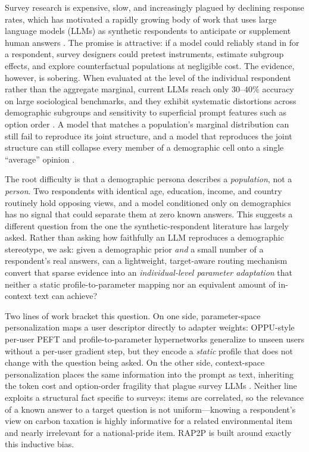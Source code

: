 \documentclass[letterpaper]{article} %
\begin{document}
Survey research is expensive, slow, and increasingly plagued by declining
response rates, which has motivated a rapidly growing body of work that uses
large language models (LLMs) as synthetic respondents to anticipate or
supplement human answers \citep{bail2024generative,sarstedt2024using,heyde2024populi,suh2025language}.
The promise is attractive: if a model could reliably stand in for a
respondent, survey designers could pretest instruments, estimate subgroup
effects, and explore counterfactual populations at negligible cost. The
evidence, however, is sobering. When evaluated at the level of the individual
respondent rather than the aggregate marginal, current LLMs reach only
$30$--$40\%$ accuracy on large sociological benchmarks, and they exhibit
systematic distortions across demographic subgroups and sensitivity to
superficial prompt features such as option order
\citep{boelaert2025machine,williams2026beyond,bult2025llms}. A model that
matches a population's marginal distribution can still fail to reproduce its
joint structure, and a model that reproduces the joint structure can still
collapse every member of a demographic cell onto a single ``average'' opinion
\citep{williams2026beyond,wang2026parametric}.

The root difficulty is that a demographic persona describes a
\emph{population}, not a \emph{person}. Two respondents with identical age,
education, income, and country routinely hold opposing views, and a model
conditioned only on demographics has no signal that could separate them at
zero known answers. This suggests a different question from the one the
synthetic-respondent literature has largely asked. Rather than asking how
faithfully an LLM reproduces a demographic stereotype, we ask: given a
demographic prior \emph{and} a small number of a respondent's real answers,
can a lightweight, target-aware routing mechanism convert that sparse evidence
into an \emph{individual-level parameter adaptation} that neither a static
profile-to-parameter mapping nor an equivalent amount of in-context text can
achieve?

Two lines of work bracket this question. On one side, parameter-space
personalization maps a user descriptor directly to adapter weights: OPPU-style
per-user PEFT \citep{tan2024democratizing} and profile-to-parameter
hypernetworks \citep{mllereberstein2024hypernetworks,gupta2026amortizing}
generalize to unseen users without a per-user gradient step, but they encode a
\emph{static} profile that does not change with the question being asked. On
the other side, context-space personalization places the same information into
the prompt as text, inheriting the token cost and option-order fragility that
plague survey LLMs \citep{boelaert2025machine}. Neither line exploits a
structural fact specific to surveys: items are correlated, so the relevance of
a known answer to a target question is not uniform---knowing a respondent's
view on carbon taxation is highly informative for a related environmental item
and nearly irrelevant for a national-pride item. RAP2P is built around exactly
this inductive bias.
\end{document}
